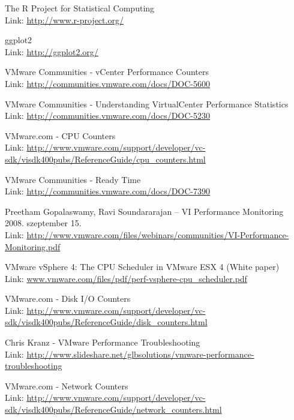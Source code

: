 \documentclass[a4paper,10pt,titlepage]{article}
\begin{document}
\begin{thebibliography}{99}

The R Project for Statistical Computing \\
Link: {\footnotesize \url{http://www.r-project.org/}}

ggplot2 \\
Link: {\footnotesize \url{http://ggplot2.org/}}

VMware Communities - vCenter Performance Counters \\
Link: {\footnotesize \url{http://communities.vmware.com/docs/DOC-5600}}

VMware Communities - Understanding VirtualCenter Performance Statistics \\
Link: {\footnotesize \url{http://communities.vmware.com/docs/DOC-5230}}

VMware.com - CPU Counters \\
Link: {\footnotesize \url{http://www.vmware.com/support/developer/vc-sdk/visdk400pubs/ReferenceGuide/cpu_counters.html}}

VMware Communities - Ready Time \\
Link: {\footnotesize \url{http://communities.vmware.com/docs/DOC-7390}}

Preetham Gopalaswamy, Ravi Soundararajan – VI Performance Monitoring \\
2008. szeptember 15. \\
Link: {\footnotesize \url{http://www.vmware.com/files/webinars/communities/VI-Performance-Monitoring.pdf}}

VMware vSphere 4: The CPU Scheduler in VMware ESX 4 (White paper) \\
Link: {\footnotesize \url{www.vmware.com/files/pdf/perf-vsphere-cpu_scheduler.pdf}}

VMware.com - Disk I/O Counters \\
Link: {\footnotesize \url{http://www.vmware.com/support/developer/vc-sdk/visdk400pubs/ReferenceGuide/disk_counters.html}}

Chris Kranz - VMware Performance Troubleshooting \\
Link: {\footnotesize \url{http://www.slideshare.net/glbsolutions/vmware-performance-troubleshooting}}

VMware.com - Network Counters \\
Link: {\footnotesize \url{http://www.vmware.com/support/developer/vc-sdk/visdk400pubs/ReferenceGuide/network_counters.html}}

\end{thebibliography}
\end{document}
